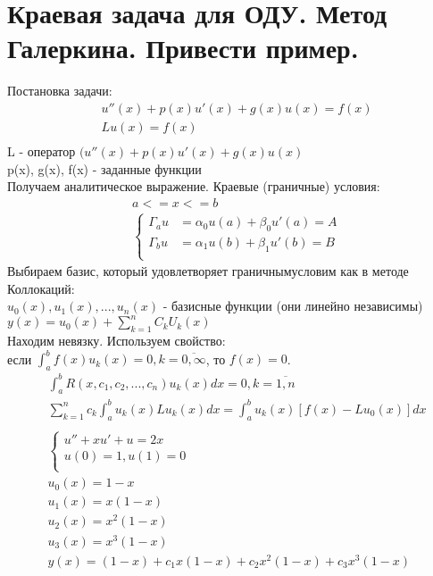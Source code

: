 \documentclass[12pt,a4paper]{article}
\begin{document}
	\section{Краевая задача для ОДУ. Метод Галеркина. Привести пример.}
	Постановка задачи:\\
	\begin{align*}
	&u''(x) + p(x) u'(x) + g(x)u(x) = f(x)\\
	&Lu(x) = f(x)\\	
	\end{align*}
	L - оператор $(u''(x) + p(x)u'(x) + g(x)u(x)$\\
	p(x), g(x), f(x) - заданные функции\\
	Получаем аналитическое выражение. Краевые (граничные) условия:\\
	\begin{align*}	
	&a <= x <= b\\
	&\begin{cases}
	\varGamma_a u &= \alpha_0 u(a) + \beta_0 u'(a) = A\\
	\varGamma_b u &= \alpha_1 u(b) + \beta_1 u'(b) = B\\
	\end{cases}
	\end{align*}
	Выбираем базис, который удовлетворяет граничнымусловим как в методе Коллокаций:\\
	$u_0(x), u_1(x), ..., u_n(x)$ - базисные функции (они линейно независимы)\\
	$y(x) = u_0(x) + \sum_{k=1}^{n}C_k U_k(x)$\\
	Находим невязку. Используем свойство:\\
	если $\displaystyle\int_{a}^{b}f(x) u_k(x) = 0, k = \overline{0, \infty}$, то $f(x) = 0$.\\
	\begin{align*}
	&\int_{a}^{b} R(x, c_1, c_2, ..., c_n) u_k(x) dx = 0, k=\overline{1,n}\\
	&\sum_{k=1}^{n} c_k \int_{a}^{b}u_k(x) L u_k(x) dx = \int_{a}^{b} u_k(x) \left[ f(x) - L u_0(x) \right] dx  \\\\
	&\begin{cases}
	u'' + xu' + u = 2x\\
	u(0) = 1 , u(1) = 0\\
	\end{cases}\\
	&u_0(x) = 1-x\\
	&u_1(x) = x (1-x)\\
	&u_2(x) = x^2(1-x)\\
	&u_3(x) = x^3(1-x)\\
	&y(x) = (1-x) + c_1 x(1-x) + c_2 x^2 (1-x) + c_3 x^3 (1-x)
	\end{align*}
\end{document}
